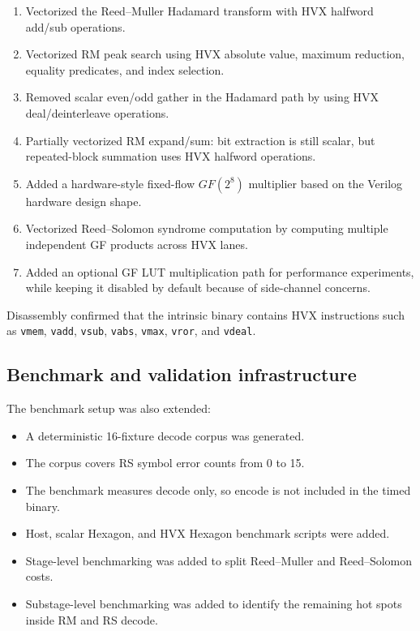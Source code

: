 \documentclass[12pt,a4paper]{article}
\begin{document}
\begin{enumerate}
    \item Vectorized the Reed--Muller Hadamard transform with HVX halfword add/sub operations.
    \item Vectorized RM peak search using HVX absolute value, maximum reduction, equality predicates, and index selection.
    \item Removed scalar even/odd gather in the Hadamard path by using HVX deal/deinterleave operations.
    \item Partially vectorized RM expand/sum: bit extraction is still scalar, but repeated-block summation uses HVX halfword operations.
    \item Added a hardware-style fixed-flow $GF(2^8)$ multiplier based on the Verilog hardware design shape.
    \item Vectorized Reed--Solomon syndrome computation by computing multiple independent GF products across HVX lanes.
    \item Added an optional GF LUT multiplication path for performance experiments, while keeping it disabled by default because of side-channel concerns.
\end{enumerate}

Disassembly confirmed that the intrinsic binary contains HVX instructions such as \texttt{vmem}, \texttt{vadd}, \texttt{vsub}, \texttt{vabs}, \texttt{vmax}, \texttt{vror}, and \texttt{vdeal}.

\subsection{Benchmark and validation infrastructure}

The benchmark setup was also extended:

\begin{itemize}
    \item A deterministic 16-fixture decode corpus was generated.
    \item The corpus covers RS symbol error counts from 0 to 15.
    \item The benchmark measures decode only, so encode is not included in the timed binary.
    \item Host, scalar Hexagon, and HVX Hexagon benchmark scripts were added.
    \item Stage-level benchmarking was added to split Reed--Muller and Reed--Solomon costs.
    \item Substage-level benchmarking was added to identify the remaining hot spots inside RM and RS decode.
\end{itemize}
\end{document}
